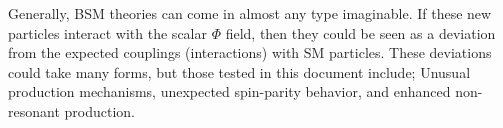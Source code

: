 Generally, BSM theories can come in almost any type imaginable. If these new particles interact with the scalar $\Phi$ field, then they could be seen as a deviation from the expected couplings (interactions) with SM particles. These deviations could take many forms, but those tested in this document include; Unusual production mechanisms, unexpected spin-parity behavior, and enhanced non-resonant production.
